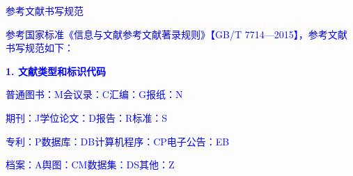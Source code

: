 %
%
%
%
%
%
%

\renewcommand{\thechapter}{参考文献}

\renewcommand*{\bibfont}{\zihao{5}}
\setlength{\bibitemsep}{0ex}
\setlength{\bibnamesep}{0ex}
\setlength{\bibinitsep}{0ex}
\renewcommand{\baselinestretch}{1.2}
\setlength{\biblabelsep}{0.5mm}
\renewcommand{\itemcmd}{
  \addvspace{\bibitemsep} %
  \mkgbnumlabel{\printfield{labelnumber}}
  \hspace{\biblabelsep}}

\textcolor{blue}{参考文献书写规范}

\textcolor{blue}{参考国家标准《信息与文献参考文献著录规则》【GB/T 7714—2015】，参考文献书写规范如下：}

\textcolor{blue}{\textbf{1. 文献类型和标识代码}}

\textcolor{blue}{普通图书：M}\qquad\textcolor{blue}{会议录：C}\qquad\textcolor{blue}{汇编：G}\qquad\textcolor{blue}{报纸：N}

\textcolor{blue}{期刊：J}\qquad\textcolor{blue}{学位论文：D}\qquad\textcolor{blue}{报告：R}\qquad\textcolor{blue}{标准：S}

\textcolor{blue}{专利：P}\qquad\textcolor{blue}{数据库：DB}\qquad\textcolor{blue}{计算机程序：CP}\qquad\textcolor{blue}{电子公告：EB}

\textcolor{blue}{档案：A}\qquad\textcolor{blue}{舆图：CM}\qquad\textcolor{blue}{数据集：DS}\qquad\textcolor{blue}{其他：Z}

